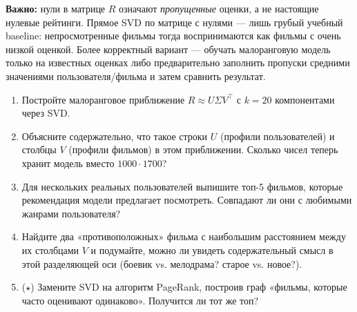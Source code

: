 \textbf{Важно:} нули в матрице $R$ означают \emph{пропущенные} оценки,
а не настоящие нулевые рейтинги. Прямое SVD по матрице с нулями — лишь
грубый учебный baseline: непросмотренные фильмы тогда воспринимаются как
фильмы с очень низкой оценкой. Более корректный вариант — обучать
малоранговую модель только на известных оценках либо предварительно
заполнить пропуски средними значениями пользователя/фильма и затем
сравнить результат.

\begin{enumerate}\itemsep1pt
  \item Постройте малоранговое приближение $R\approx U\Sigma V^{\!\top}$
        с $k=20$ компонентами через SVD.
  \item Объясните содержательно, что такое строки $U$ (профили
        пользователей) и столбцы $V$ (профили фильмов) в этом
        приближении. Сколько чисел теперь хранит модель вместо
        $1000\cdot 1700$?
  \item Для нескольких реальных пользователей выпишите топ-5 фильмов,
        которые рекомендация модели предлагает посмотреть. Совпадают
        ли они с любимыми жанрами пользователя?
  \item Найдите два «противоположных» фильма с наибольшим расстоянием
        между их столбцами $V$ и подумайте, можно ли увидеть содержательный
        смысл в этой разделяющей оси (боевик vs. мелодрама? старое vs. новое?).
  \item ($\star$) Замените SVD на алгоритм PageRank, построив граф
        «фильмы, которые часто оценивают одинаково». Получится ли тот
        же топ?
\end{enumerate}

